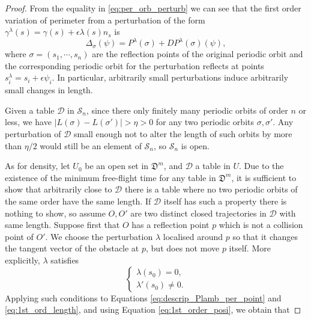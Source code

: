 \documentclass[reqno,11pt]{amsart}
\begin{document}
\begin{proof}
    From the equality in \eqref{eq:per_orb_perturb} we can see that the first order variation of perimeter from a perturbation of the form \( \gamma^\lambda(s) = \gamma(s) + \epsilon\lambda(s)n_s \) is
    \begin{equation}\label{eq:1st_ord_length}
        \Delta_\sigma(\psi) = P^\lambda(\sigma) + DP^\lambda(\sigma)(\psi),
    \end{equation}
    where \( \sigma = (s_1, \cdots, s_n) \) are the reflection points of the original periodic orbit and the corresponding periodic orbit for the perturbation reflects at points \( s_i^\lambda = s_i + \epsilon\psi_i \).
    In particular, arbitrarily small perturbations induce arbitrarily small changes in length.
    \par Given a table \( \mathcal{D} \) in \( \mathcal{S}_n \), since there only finitely many periodic orbits of order \( n \) or less, we have \( \lvert L(\sigma) - L(\sigma')\rvert > \eta > 0 \) for any two periodic orbits \( \sigma, \sigma' \).
    Any perturbation of \( \mathcal{D} \) small enough not to alter the length of such orbits by more than \( \eta/2 \) would still be an element of \( \mathcal{S}_n \), so \( \mathcal{S}_n \) is open. 
    \par As for density, let \( U_0 \) be an open set in \( \mathfrak{D}^m \), and \( \mathcal{D} \) a table in \( U \).
    Due to the existence of the minimum free-flight time for any table in \( \mathfrak{D}^m \), it is sufficient to show that arbitrarily close to \( \mathcal{D} \) there is a table where no two periodic orbits of the same order have the same length.
    If \( \mathcal{D} \) itself has such a property there is nothing to show, so assume \( O, O' \) are two distinct closed trajectories in \( \mathcal{D} \) with same length.
    Suppose first that \( O \) has a reflection point \( p \) which is not a collision point of \( O' \).
    We choose the perturbation \( \lambda \) localised around \( p \) so that it changes the tangent vector of the obstacle at \( p \), but does not move \( p \) itself. 
    More explicitly, \( \lambda \) satisfies
    \begin{equation}
    \begin{cases}\label{eq:cond_lamb}
        \lambda(s_0) = 0, \\
        \lambda'(s_0) \neq 0.
    \end{cases}
    \end{equation}
    Applying such conditions to Equations \eqref{eq:descrip_Plamb_per_point} and \eqref{eq:1st_ord_length}, and using Equation \eqref{eq:1st_order_posi}, we obtain that

\end{proof}
\end{document}
